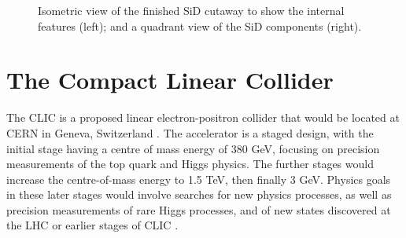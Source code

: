 \begin{figure}[p]%
	\centering
    \qquad
    \caption{Isometric view of the finished \acrshort{SiD} cutaway to show the internal features (left); and a quadrant view of the \acrshort{SiD} components (right).}%
    \label{figure:colliders/SiD/double}%
\end{figure}

\section{The Compact Linear Collider}
The \acrfull{CLIC} is a proposed linear electron-positron collider that would be located at \acrshort{CERN} in Geneva, Switzerland \cite{clic-cdr-main}. The accelerator is a staged design, with the initial stage having a centre of mass energy of 380 GeV, focusing on precision measurements of the top quark and Higgs physics. The further stages would increase the centre-of-mass energy to 1.5 TeV, then finally 3 GeV. Physics goals in these later stages would involve searches for new physics processes, as well as precision measurements of rare Higgs processes, and of new states discovered at the LHC or earlier stages of \acrshort{CLIC} \cite{clic-cdr-physicsanddetector}. 

